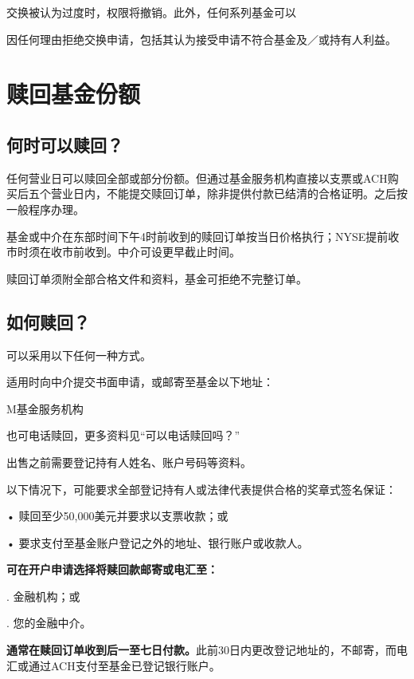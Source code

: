 \documentclass[UTF8,fontset=none,11pt,a4paper]{ctexart}
\begin{document}
交换被认为过度时，权限将撤销。此外，任何系列\allowbreak\mbox{基金可以}

因任何理由拒绝交换申请，包括其认为接受申请不符合基金及／或持\allowbreak\mbox{有人利益。}

\section*{赎回基金份额}\label{unitU700}
\subsection*{何时可以赎回？}
任何营业日可以赎回全部或部分份额。但通过基金服务机构直接以支票或ACH购买后五个营业日内，不能提交赎回订单，除非提供付款已结清的合格证明。之后按一般\allowbreak\mbox{程序办理。}

基金或中介在东部时间下午4时前收到的赎回订单按当日价格执行；NYSE提前收市时须在收市前收到。中介可设更早\allowbreak\mbox{截止时间。}

赎回订单须附全部合格文件和资料，基金可拒绝不\allowbreak\mbox{完整订单。}

\subsection*{如何赎回？}
可以采用以下任何\allowbreak\mbox{一种方式。}

适用时向中介提交书面申请，或邮寄至基金\allowbreak\mbox{以下地址：}

\noindent M基金\allowbreak\mbox{服务机构}\par\smallskip
也可电话赎回，更多资料见“可以电\allowbreak\mbox{话赎回吗？”}

出售之前需要登记持有人姓名、账户号\allowbreak\mbox{码等资料。}

以下情况下，可能要求全部登记持有人或法律代表提供合格的奖章式\allowbreak\mbox{签名保证：}

\noindent • 赎回至少50,000美元并要求以支票收款；或\par\smallskip
\noindent • 要求支付至基金账户登记之外的地址、银行账户\allowbreak\mbox{或收款人。}\par\smallskip

\par{}\label{originalpage19}
\textbf{可在开户申请选择将赎回款邮寄或电汇至：}

. 金融机构；或


. 您的\allowbreak\mbox{金融中介。}


\textbf{通常在赎回订单收到后一至七日付款。}此前30日内更改登记地址的，不邮寄，而电汇或通过ACH支付至基金已登记\allowbreak\mbox{银行账户。}
\end{document}
